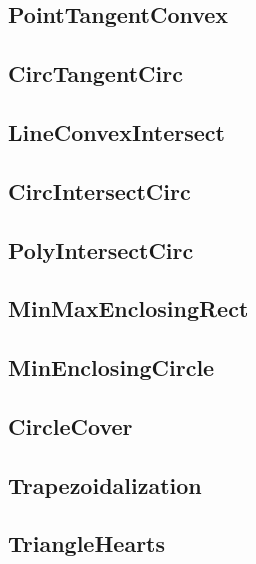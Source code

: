 	\subsection{PointTangentConvex}
	
	\subsection{CircTangentCirc}
	
	\subsection{LineConvexIntersect}
	
	\subsection{CircIntersectCirc}
	
	\subsection{PolyIntersectCirc}
	
	\subsection{MinMaxEnclosingRect}
	
	\subsection{MinEnclosingCircle}
	
	\subsection{CircleCover}
	
	\subsection{Trapezoidalization}
	
	\subsection{TriangleHearts}
	
